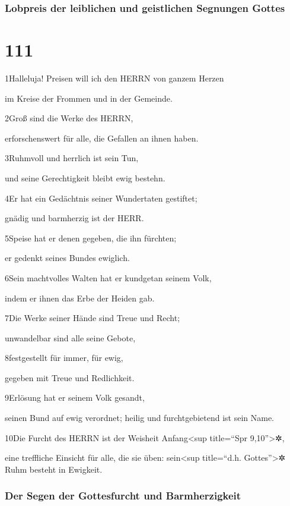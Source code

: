 \hypertarget{lobpreis-der-leiblichen-und-geistlichen-segnungen-gottes}{%
\subsubsection{Lobpreis der leiblichen und geistlichen Segnungen
Gottes}\label{lobpreis-der-leiblichen-und-geistlichen-segnungen-gottes}}

\hypertarget{section-110}{%
\section{111}\label{section-110}}

1Halleluja! Preisen will ich den HERRN von ganzem Herzen

im Kreise der Frommen und in der Gemeinde.

2Groß sind die Werke des HERRN,

erforschenswert für alle, die Gefallen an ihnen haben.

3Ruhmvoll und herrlich ist sein Tun,

und seine Gerechtigkeit bleibt ewig bestehn.

4Er hat ein Gedächtnis seiner Wundertaten gestiftet;

gnädig und barmherzig ist der HERR.

5Speise hat er denen gegeben, die ihn fürchten;

er gedenkt seines Bundes ewiglich.

6Sein machtvolles Walten hat er kundgetan seinem Volk,

indem er ihnen das Erbe der Heiden gab.

7Die Werke seiner Hände sind Treue und Recht;

unwandelbar sind alle seine Gebote,

8festgestellt für immer, für ewig,

gegeben mit Treue und Redlichkeit.

9Erlösung hat er seinem Volk gesandt,

seinen Bund auf ewig verordnet; heilig und furchtgebietend ist sein
Name.

10Die Furcht des HERRN ist der Weisheit Anfang\textless sup title=``Spr
9,10''\textgreater✲,

eine treffliche Einsicht für alle, die sie üben: sein\textless sup
title=``d.h. Gottes''\textgreater✲ Ruhm besteht in Ewigkeit.

\hypertarget{der-segen-der-gottesfurcht-und-barmherzigkeit}{%
\subsubsection{Der Segen der Gottesfurcht und
Barmherzigkeit}\label{der-segen-der-gottesfurcht-und-barmherzigkeit}}

